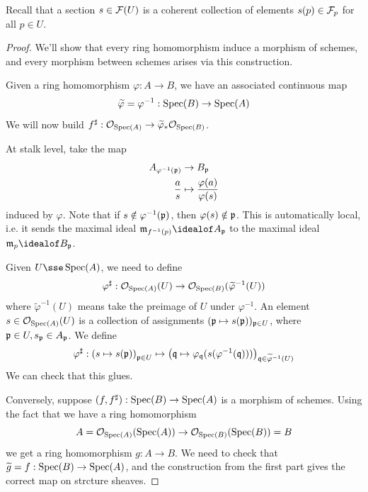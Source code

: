 \documentclass{article}
\begin{document}
Recall that a section \(s \in \mathcal{F}(U)\) is a coherent collection of elements \(s(p) \in \mathcal{F}_p\) for all \(p \in U\).

\begin{proof}
    We'll show that every ring homomorphism induce a morphism of schemes, and every morphism between schemes arises via this construction.

    Given a ring homomorphism \(\varphi : A \to B\), we have an associated continuous map
    \[\widetilde\varphi = \varphi^{-1} : \operatorname{Spec}(B) \to \operatorname{Spec}(A)\]
    We will now build \(f^\sharp : \mathcal{O}_{\operatorname{Spec}(A)} \to \widetilde\varphi_*\mathcal{O}_{\operatorname{Spec}(B)}\).

    At stalk level, take the map
    \begin{align*}
        A_{\varphi^{-1}(\mathfrak{p})} &\to B_{\mathfrak{p}} \\
        \frac{a}{s} &\mapsto \frac{\varphi(a)}{\varphi(s)}
    \end{align*}
    induced by \(\varphi\). Note that if \(s \notin \varphi^{-1}(\mathfrak{p})\), then \(\varphi(s) \notin \mathfrak{p}\). This is automatically local, i.e. it sends the maximal ideal \(\mfm_{f^{-1}(p)} \idealof A_\mfp\) to the maximal ideal \(\mfm_p \idealof B_\mfp\).

    Given \(U \sse \Spec(A)\), we need to define
    \[\varphi^\sharp : \mathcal{O}_{\operatorname{Spec}(A)}(U) \to \mathcal{O}_{\operatorname{Spec}(B)}(\widetilde\varphi^{-1}(U))\]
    where \(\widetilde\varphi^{-1}(U)\) means take the preimage of \(U\) under \(\varphi^{-1}\). An element \(s \in \mathcal{O}_{\operatorname{Spec}(A)}(U)\) is a collection of assignments \((\mathfrak{p} \mapsto s(\mathfrak{p}))_{\mathfrak{p} \in U}\), where \(\mathfrak{p} \in U, s_{\mathfrak{p}} \in A_{\mathfrak{p}}\). We define
    \[\varphi^\sharp : \left(s \mapsto s(\mathfrak{p})\right)_{\mathfrak{p} \in U} \mapsto \left(\mathfrak{q} \mapsto \varphi_{\mathfrak{q}}(s(\varphi^{-1}(\mathfrak{q})))\right)_{\mathfrak{q} \in \widetilde\varphi^{-1}(U)}\]
    We can check that this glues.

    Conversely, suppose \((f, f^\sharp) : \operatorname{Spec}(B) \to \operatorname{Spec}(A)\) is a morphism of schemes. Using the fact that we have a ring homomorphism
    \[A = \mathcal{O}_{\operatorname{Spec}(A)}(\operatorname{Spec}(A)) \to \mathcal{O}_{\operatorname{Spec}(B)}(\operatorname{Spec}(B)) = B\]
    we get a ring homomorphism \(g : A \to B\). We need to check that \(\widetilde g = f : \operatorname{Spec}(B) \to \operatorname{Spec}(A)\), and the construction from the first part gives the correct map on strcture sheaves.


\end{proof}
\end{document}
